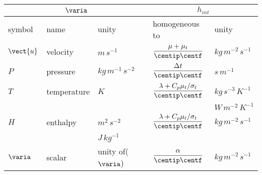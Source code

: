 \begin{table}
\begin{center}
\begin{tabular}{||l|l|l||l|l||}
\hline
\multicolumn{3}{||c||}{$\varia$} & \multicolumn{2}{c||}{$h_{int}$}     \\
\hline
symbol                         & name                        & unity                         & homogeneous to                  & unity            \\
\hline
$\vect{u}$                    & velocity                    & $m\,s^{-1}$               &$\dfrac{\mu+\mu_t}{ \centip \centf}$   & $kg\,m^{-2}\,s^{-1}$       \\
$P$                             & pressure                    & $kg\,m^{-1}\,s^{-2}$ & $\dfrac{\Delta t}{ \centip \centf}$      & $s\,m^{-1}$                \\
$T$                             & temperature              & $K$                              &$\dfrac{\lambda+C_p\mu_t/\sigma_t}{ \centip \centf}$  &$kg\,s^{-3}\,K^{-1}$\\
                                   &                                   &                                    &                                                            & $W\,m^{-2}\,K^{-1}$\\
$H$                             & enthalpy                   & $m^{2}\,s^{-2}$           &$\dfrac{\lambda+C_p\mu_t/\sigma_t}{ \centip \centf}$ &$kg\,m^{-2}\,s^{-1}$\\
                                   &                                   & $J\,kg^{-1} $               &                                                            &                                  \\
$\varia$                      & scalar                        & unity of($\varia$)         &$\dfrac{\alpha}{ \centip \centf}$         & $kg\,m^{-2}\,s^{-1}$       \\
\hline
\end{tabular}
\end{center}


\end{table}
